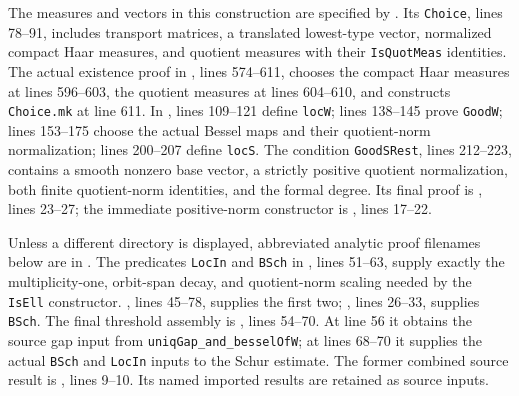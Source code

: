 \documentclass[11pt,a4paper]{article}
\begin{document}
The measures and vectors in this construction are specified by
.
Its \texttt{Choice}, lines 78--91, includes transport matrices, a
translated lowest-type vector, normalized compact Haar measures, and
quotient measures with their \texttt{IsQuotMeas} identities.
The actual existence proof in
,
lines 574--611, chooses the compact Haar measures at lines 596--603,
the quotient measures at lines 604--610, and constructs
\texttt{Choice.mk} at line 611.  In ,
lines 109--121 define \texttt{locW}; lines 138--145 prove
\texttt{GoodW}; lines 153--175 choose the actual Bessel maps and
their quotient-norm normalization; lines 200--207 define
\texttt{locS}.  The condition \texttt{GoodSRest}, lines 212--223,
contains a smooth nonzero base vector, a strictly positive quotient
normalization, both finite quotient-norm identities, and the formal
degree.  Its final proof is
,
lines 23--27; the immediate positive-norm constructor is
,
lines 17--22.

Unless a different directory is displayed, abbreviated analytic proof
filenames below are in
.
The predicates \texttt{LocIn} and \texttt{BSch} in
,
lines 51--63, supply exactly the multiplicity-one, orbit-span decay,
and quotient-norm scaling needed by the \texttt{IsEll} constructor.
, lines 45--78,
supplies the first two; , lines 26--33,
supplies \texttt{BSch}.  The final threshold assembly is
,
lines 54--70.  At line 56 it obtains the source gap input from
\texttt{uniqGap\_and\_besselOfW}; at lines 68--70 it supplies the
actual \texttt{BSch} and \texttt{LocIn} inputs to the Schur estimate.
The former combined source result is
, lines 9--10.
Its named imported results are retained as source inputs.
\end{document}
